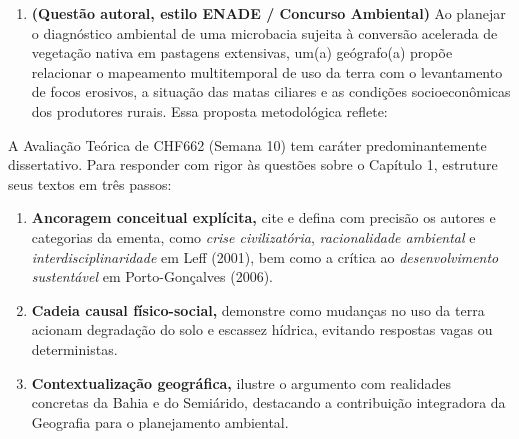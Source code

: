 \begin{enumerate}[leftmargin=1.8em, itemsep=5pt, start=16]
  \item \textbf{(Questão autoral, estilo ENADE / Concurso Ambiental)} Ao planejar o diagnóstico ambiental de uma microbacia sujeita à conversão acelerada de vegetação nativa em pastagens extensivas, um(a) geógrafo(a) propõe relacionar o mapeamento multitemporal de uso da terra com o levantamento de focos erosivos, a situação das matas ciliares e as condições socioeconômicas dos produtores rurais. Essa proposta metodológica reflete:
  \espacoResolucao[1.8cm]
\end{enumerate}

\begin{boxDica}
A Avaliação Teórica de CHF662 (Semana 10) tem caráter predominantemente dissertativo. Para responder com rigor às questões sobre o Capítulo 1, estruture seus textos em três passos:
\begin{enumerate}[leftmargin=1.5em, itemsep=2pt]
  \item \textbf{Ancoragem conceitual explícita,} cite e defina com precisão os autores e categorias da ementa, como \emph{crise civilizatória}, \emph{racionalidade ambiental} e \emph{interdisciplinaridade} em Leff (2001), bem como a crítica ao \emph{desenvolvimento sustentável} em Porto-Gonçalves (2006).
  \item \textbf{Cadeia causal físico-social,} demonstre como mudanças no uso da terra acionam degradação do solo e escassez hídrica, evitando respostas vagas ou deterministas.
  \item \textbf{Contextualização geográfica,} ilustre o argumento com realidades concretas da Bahia e do Semiárido, destacando a contribuição integradora da Geografia para o planejamento ambiental.
\end{enumerate}
\end{boxDica}

